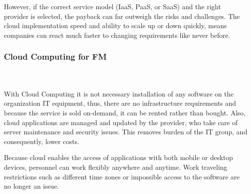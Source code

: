 

However, if the correct service model (IaaS, PaaS, or SaaS) and the right provider is selected, the payback can far outweigh the risks and challenges. The cloud implementation speed and ability to scale up or down quickly, means companies can react much faster to changing requirements like never before.

\subsubsection{Cloud Computing for FM}
\hfill \\ \\ With Cloud Computing it is not necessary installation of any software on the organization IT equipment, thus, there are no infrastructure requirements and because the service is sold on-demand, it can be rented rather than bought. Also, cloud applications are managed and updated by the provider, who take care of server maintenance and security issues. This removes burden of the IT group, and consequently, lower costs.

Because cloud enables the access of applications with both mobile or desktop devices, personnel can work flexibly anywhere and anytime. Work traveling restrictions such as different time zones or impossible access to the software are no longer an issue.








